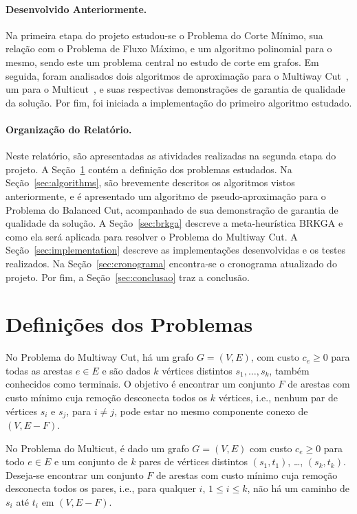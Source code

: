 \documentclass[12pt, a4paper]{article}
\begin{document}
\paragraph{Desenvolvido Anteriormente.} Na primeira etapa do projeto estudou-se o Problema do Corte Mínimo, sua relação com o Problema de Fluxo Máximo, e um algoritmo polinomial para o mesmo, sendo este um problema central no estudo de corte em grafos. Em seguida, foram analisados dois algoritmos de aproximação para o Multiway Cut~\cite{DJPSY1994, CKR2000}, um para o Multicut~\cite{GVY1996}, e suas respectivas demonstrações de garantia de qualidade da solução. Por fim, foi iniciada a implementação do primeiro algoritmo estudado.

\paragraph{Organização do Relatório.} Neste relatório, são apresentadas as atividades realizadas na segunda etapa do projeto. A Seção~\ref{sec:problem} contém a definição dos problemas estudados. Na Seção~\ref{sec:algorithms}, são brevemente descritos os algoritmos vistos anteriormente, e é apresentado um algoritmo de pseudo-aproximação para o Problema do Balanced Cut, acompanhado de sua demonstração de garantia de qualidade da solução. A Seção~\ref{sec:brkga} descreve a meta-heurística BRKGA e como ela será aplicada para resolver o Problema do Multiway Cut. A Seção~\ref{sec:implementation} descreve as implementações desenvolvidas e os testes realizados. Na Seção~\ref{sec:cronograma} encontra-se o cronograma atualizado do projeto. Por fim, a Seção~\ref{sec:conclusao} traz a conclusão.

\section{Definições dos Problemas} \label{sec:problem}
No Problema do Multiway Cut, há um grafo $G=(V,E)$, com custo $c_{e} \ge 0$ para todas as arestas $e \in E$ e são dados $k$ vértices distintos $s_1, \dots, s_k$, também conhecidos como terminais. O objetivo é encontrar um conjunto $F$ de arestas com custo mínimo cuja remoção desconecta todos os $k$ vértices, i.e., nenhum par de vértices $s_{i}$ e $s_{j}$, para $i \neq j$, pode estar no mesmo componente conexo de $(V, E-F)$.

No Problema do Multicut, é dado um grafo $G=(V, E)$ com custo $c_{e} \ge 0$ para todo $e \in E$ e um conjunto de $k$ pares de vértices distintos $(s_{1}, t_{1})$, \dots, $(s_{k}, t_{k})$.
Deseja-se encontrar um conjunto $F$ de arestas com custo mínimo cuja remoção desconecta todos os pares, i.e., para qualquer $i$, $1 \leq i \leq k$, não há um caminho de $s_{i}$ até $t_{i}$ em $(V, E-F)$.
\end{document}

